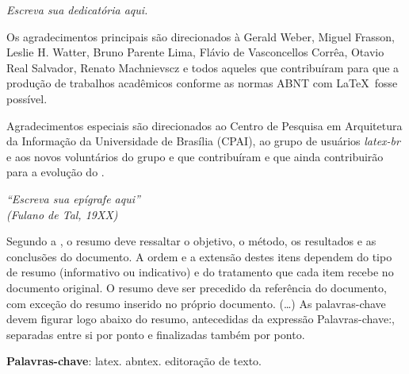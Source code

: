 \documentclass[
	12pt,				%
	openright,			%
	twoside,			%
	a4paper,			%
	english,			%
	brazil				%
	]{abntex2}
\begin{document}
\begin{dedicatoria}
   \vspace*{\fill}
   \centering
   \noindent
   \textit{ Escreva sua dedicatória aqui.} \vspace*{\fill}
\end{dedicatoria}

\begin{agradecimentos}
Os agradecimentos principais são direcionados à Gerald Weber, Miguel Frasson,
Leslie H. Watter, Bruno Parente Lima, Flávio de Vasconcellos Corrêa, Otavio Real
Salvador, Renato Machnievscz e todos aqueles que
contribuíram para que a produção de trabalhos acadêmicos conforme
as normas ABNT com \LaTeX\ fosse possível.

Agradecimentos especiais são direcionados ao Centro de Pesquisa em Arquitetura
da Informação da Universidade de
Brasília (CPAI), ao grupo de usuários
\emph{latex-br} e aos
novos voluntários do grupo
\emph{\abnTeX} e que contribuíram e que ainda
contribuirão para a evolução do \abnTeX.

\end{agradecimentos}

\begin{epigrafe}
    \vspace*{\fill}
	\begin{flushright}
		\textit{``Escreva sua epígrafe aqui''\\
		(Fulano de Tal, 19XX)}
	\end{flushright}
\end{epigrafe}


\setlength{\absparsep}{18pt} %
\begin{resumo}
 Segundo a \cite{NBR6028:2003}, o resumo deve ressaltar o
 objetivo, o método, os resultados e as conclusões do documento. A ordem e a extensão
 destes itens dependem do tipo de resumo (informativo ou indicativo) e do
 tratamento que cada item recebe no documento original. O resumo deve ser
 precedido da referência do documento, com exceção do resumo inserido no
 próprio documento. (\ldots) As palavras-chave devem figurar logo abaixo do
 resumo, antecedidas da expressão Palavras-chave:, separadas entre si por
 ponto e finalizadas também por ponto.

 \textbf{Palavras-chave}: latex. abntex. editoração de texto.
\end{resumo}
\end{document}
